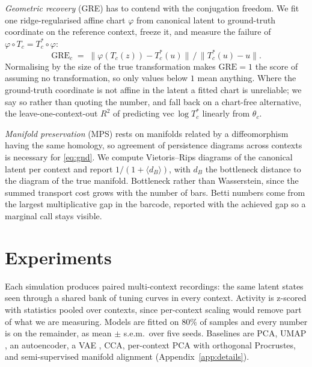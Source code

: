 \documentclass{article}
\theoremstyle{plain}
\begin{document}
\textit{Geometric recovery} (GRE) has to contend with the conjugation freedom. We
fit one ridge-regularised affine chart $\varphi$ from canonical latent to
ground-truth coordinate on the reference context, freeze it, and measure the
failure of $\varphi \circ T_c = T^{*}_c \circ \varphi$:
\begin{equation}
  \mathrm{GRE}_c \;=\; \big\|\varphi(T_c(z)) - T^{*}_c(u)\big\| \,\big/\,
                       \big\|T^{*}_c(u) - u\big\| .
  \label{eq:gre}
\end{equation}
Normalising by the size of the true transformation makes $\mathrm{GRE}=1$ the
score of assuming no transformation, so only values below $1$ mean anything.
Where the ground-truth coordinate is not affine in the latent a fitted chart is
unreliable; we say so rather than quoting the number, and fall back on a
chart-free alternative, the leave-one-context-out $R^2$ of predicting
$\mathrm{vec}\,\log T^{*}_c$ linearly from $\theta_c$.

\textit{Manifold preservation} (MPS) rests on manifolds related by a
diffeomorphism having the same homology, so agreement of persistence diagrams
across contexts is necessary for \eqref{eq:gnd}. We compute Vietoris--Rips
diagrams of the canonical latent per context and report $1/(1 + \langle
d_{B}\rangle)$, with $d_B$ the bottleneck distance to the diagram of the true
manifold. Bottleneck rather than Wasserstein, since the summed transport cost
grows with the number of bars. Betti numbers come from the largest multiplicative
gap in the barcode, reported with the achieved gap so a marginal call stays
visible.

\FloatBarrier
\section{Experiments}
\label{sec:experiments}

Each simulation produces paired multi-context recordings: the same latent states
seen through a shared bank of tuning curves in every context. Activity is
z-scored with statistics pooled over contexts, since per-context scaling would
remove part of what we are measuring. Models are fitted on 80\% of samples and
every number is on the remainder, as mean $\pm$ s.e.m.\ over five seeds.
Baselines are PCA, UMAP \citep{mcinnes2018umap}, an autoencoder, a VAE
\citep{kingma2014auto}, CCA, per-context PCA with orthogonal Procrustes, and
semi-supervised manifold alignment (Appendix~\ref{app:details}).
\end{document}
